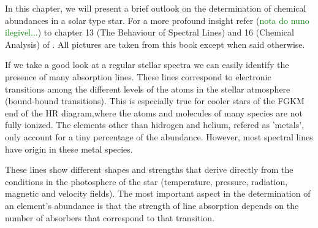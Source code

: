 \documentclass[dvips,12pt,a4paper]{report}
\begin{document}
{\indent In this chapter, we will present a brief outlook on the determination of chemical abundances in a solar type star. For a more profound insight refer (\textcolor{green}{nota do nuno ilegivel...}) to chapter 13 (The Behaviour of Spectral Lines) and 16 (Chemical Analysis) of \citet{Gray-2005}. All pictures are taken from this book except when said otherwise.

If we take a good look at a regular stellar spectra we can easily identify the presence of many absorption lines. These lines correspond to electronic transitions among the different levels of the atoms in the stellar atmosphere (bound-bound transitions). This is especially true for cooler stars of the FGKM end of the HR diagram,where the atoms and molecules of many species are not fully ionized. %
The elements other than hidrogen and helium, refered as 'metals', only account for a tiny percentage of the abundance. However, most spectral lines have origin in these metal species.

These lines show different shapes and strengths that derive directly from the conditions in the photosphere of the star (temperature, pressure, radiation, magnetic and velocity fields). %
The most important aspect in the determination of an element's abundance is that the strength of line absorption depends on the number of absorbers that correspond to that transition.  


}
\end{document}
